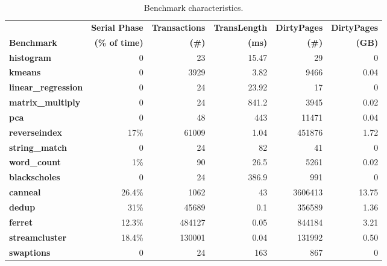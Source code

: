 \begin{table*}[!t]
\centering
\begin{tabular}{l|rrrrr}
& {\bf \small Serial Phase} & {\bf \small Transactions} & {\bf \small TransLength} & {\bf \small DirtyPages} & {\bf \small DirtyPages}
\\
{\bf \small Benchmark} & {\bf \small (\% of time)} & {\bf (\#)} & {\bf \small (ms)} & {\bf \small (\#)} & {\bf \small (GB)}\\
\hline
\small \textbf{histogram} & 0 & 23 & 15.47 & 29 & 0 \\
\small \textbf{kmeans} & 0 & 3929 & 3.82 & 9466 & 0.04\\
\small \textbf{linear\_regression} & 0 & 24 & 23.92 & 17 & 0\\
\small \textbf{matrix\_multiply} & 0 & 24 & 841.2 & 3945 & 0.02\\
\small \textbf{pca} & 0 & 48 & 443 & 11471 & 0.04 \\
\small \textbf{reverseindex} & 17\% & 61009 & 1.04 & 451876 & 1.72\\
\small \textbf{string\_match} & 0 & 24 & 82 & 41 & 0 \\
\small \textbf{word\_count} & 1\% & 90 & 26.5 & 5261 & 0.02\\
\small \textbf{blackscholes} & 0 & 24 & 386.9 & 991 & 0\\
\small \textbf{canneal} & 26.4\% & 1062 & 43 & 3606413 & 13.75\\
\small \textbf{dedup} & 31\% & 45689 & 0.1 & 356589 & 1.36\\
\small \textbf{ferret} & 12.3\% & 484127 & 0.05 & 844184 & 3.21 \\
\small \textbf{streamcluster} & 18.4\% & 130001 & 0.04 & 131992 & 0.50\\
\small \textbf{swaptions} & 0 & 24 & 163 & 867 & 0\\
\hline
\end{tabular}
\caption{Benchmark characteristics.\label{tbl:characteristics}}
\end{table*}

